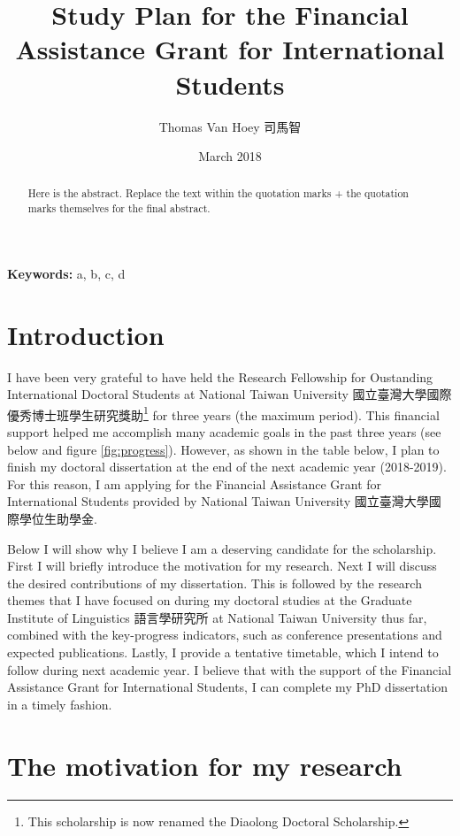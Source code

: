 \documentclass[12pt,]{article}
\title{Study Plan for the Financial Assistance Grant for International Students}
\author{Thomas Van Hoey 司馬智}
\date{March 2018}
\let\rmarkdownfootnote\footnote%
\def\footnote{\protect\rmarkdownfootnote}
\theoremstyle{definition}
\theoremstyle{definition}
\theoremstyle{definition}
\theoremstyle{remark}
\begin{document}
\maketitle

\begin{abstract}
\noindent Here is the abstract. Replace the text within the quotation marks + the
quotation marks themselves for the final abstract.
\end{abstract}

\newcommand*{\keywords}[1]{\textbf{Keywords:} #1}
    \keywords{a, b, c, d}

\section{Introduction}\label{introduction}

I have been very grateful to have held the Research Fellowship for
Oustanding International Doctoral Students at National Taiwan University
國立臺灣大學國際優秀博士班學生研究獎助\footnote{This scholarship is now
  renamed the Diaolong Doctoral Scholarship.} for three years (the
maximum period). This financial support helped me accomplish many
academic goals in the past three years (see below and figure
\ref{fig:progress}). However, as shown in the table below, I plan to
finish my doctoral dissertation at the end of the next academic year
(2018-2019). For this reason, I am applying for the Financial Assistance
Grant for International Students provided by National Taiwan University
國立臺灣大學國際學位生助學金.

Below I will show why I believe I am a deserving candidate for the
scholarship. First I will briefly introduce the motivation for my
research. Next I will discuss the desired contributions of my
dissertation. This is followed by the research themes that I have
focused on during my doctoral studies at the Graduate Institute of
Linguistics 語言學研究所 at National Taiwan University thus far,
combined with the key-progress indicators, such as conference
presentations and expected publications. Lastly, I provide a tentative
timetable, which I intend to follow during next academic year. I believe
that with the support of the Financial Assistance Grant for
International Students, I can complete my PhD dissertation in a timely
fashion.

\section{The motivation for my
research}\label{the-motivation-for-my-research}
\end{document}
